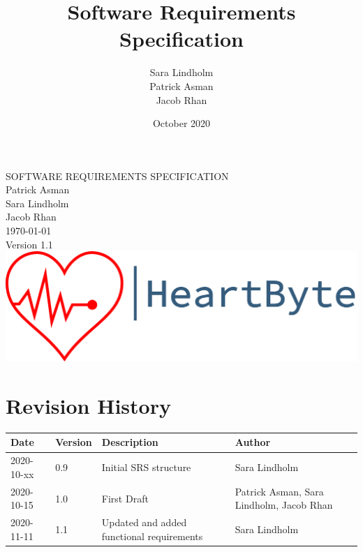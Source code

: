 \documentclass{scrreprt}
\title{Software Requirements Specification}
\author{Sara Lindholm \\ Patrick Asman \\ Jacob Rhan}
\date{October 2020}
\def\myversion{1.1 }
\begin{document}
\begin{titlepage}
    \begin{center}
    \begin{bfseries}
        \Huge{SOFTWARE REQUIREMENTS SPECIFICATION}\\
        \vspace{1.5cm}
        \LARGE Patrick Asman \\ Sara Lindholm \\ Jacob Rhan \\
        \vspace{1.5cm}
        \today\\
        \vspace{1.5cm}
        {Version \myversion}\\
        \vfill
        \includegraphics[width=\linewidth]{Pictures/logo.png} \\
    \end{bfseries}
    \end{center}
\end{titlepage}

\tableofcontents

\chapter*{Revision History}
\begin{center}
\begin{tabular}{|p{}|p{}|p{6cm}|p{4cm}|}
 \hline
 \textbf{Date} & \textbf{Version} & \textbf{Description} & \textbf{Author} \\ 
 \hline
 2020-10-xx & 0.9 & Initial SRS structure & Sara Lindholm \\
 \hline
 2020-10-15 & 1.0 & First Draft & Patrick Asman, Sara Lindholm, Jacob Rhan \\ 
 \hline
 2020-11-11 & 1.1 & Updated and added functional requirements & Sara Lindholm \\
 \hline
\end{tabular}
\end{center}
\end{document}
